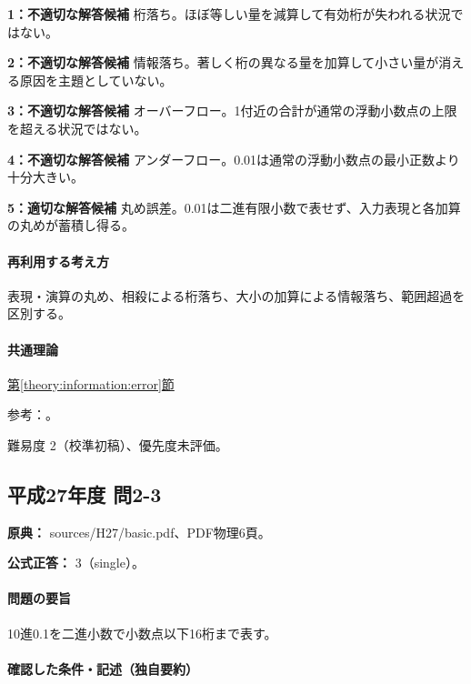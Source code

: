 \noindent\textbf{1：不適切な解答候補} 桁落ち。ほぼ等しい量を減算して有効桁が失われる状況ではない。\par

\noindent\textbf{2：不適切な解答候補} 情報落ち。著しく桁の異なる量を加算して小さい量が消える原因を主題としていない。\par

\noindent\textbf{3：不適切な解答候補} オーバーフロー。1付近の合計が通常の浮動小数点の上限を超える状況ではない。\par

\noindent\textbf{4：不適切な解答候補} アンダーフロー。0.01は通常の浮動小数点の最小正数より十分大きい。\par

\noindent\textbf{5：適切な解答候補} 丸め誤差。0.01は二進有限小数で表せず、入力表現と各加算の丸めが蓄積し得る。\par

\paragraph{再利用する考え方} 表現・演算の丸め、相殺による桁落ち、大小の加算による情報落ち、範囲超過を区別する。

\paragraph{共通理論} \hyperref[theory:information:error]{第\ref*{theory:information:error}節}

\par 参考：\cite{goldberg1991}。

\par 難易度 2（校準初稿）、優先度未評価。

\subsection{平成27年度 問2-3}
\label{q:h27-reg-basic-2-3}

\noindent\textbf{原典：} sources/H27/basic.pdf、PDF物理6頁。

\textbf{公式正答：} 3（single）。

\paragraph{問題の要旨} 10進0.1を二進小数で小数点以下16桁まで表す。

\paragraph{確認した条件・記述（独自要約）}\mbox{}\par

